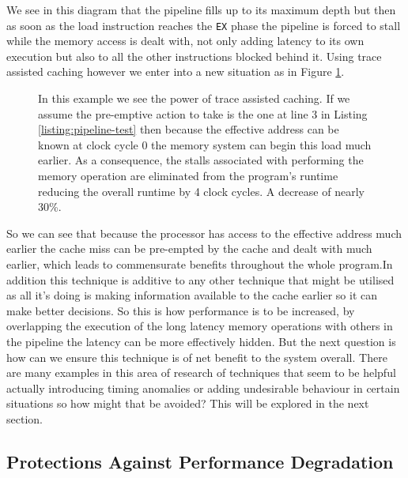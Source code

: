 We see in this diagram that the pipeline fills up to its maximum depth but then as soon as the load instruction reaches the \texttt{EX} phase the pipeline is forced to stall while the memory access is dealt with, not only adding latency to its own execution but also to all the other instructions blocked behind it. Using trace assisted caching however we enter into a new situation as in Figure \ref{fig:ideal-pipeline}.

\begin{figure}
	\begin{center}
		
		\caption[Pipeline Diagram - With Trace Assisted Caching]{In this example we see the power of trace assisted caching. If we assume the pre-emptive action to take is the one at line 3 in Listing \ref{listing:pipeline-test} then because the effective address can be known at clock cycle 0 the memory system can begin this load much earlier. As a consequence, the stalls associated with performing the memory operation are eliminated from the program's runtime reducing the overall runtime by 4 clock cycles. A decrease of nearly 30\%.}
		\label{fig:ideal-pipeline}
	\end{center}
\end{figure}


So we can see that because the processor has access to the effective address much earlier the cache miss can be pre-empted by the cache and dealt with much earlier, which leads to commensurate benefits throughout the whole program.In addition this technique is additive to any other technique that might be utilised as all it's doing is making information available to the cache earlier so it can make better decisions. So this is how performance is to be increased, by overlapping the execution of the long latency memory operations with others in the pipeline the latency can be more effectively hidden. But the next question is how can we ensure this technique is of net benefit to the system overall. There are many examples in this area of research of techniques that seem to be helpful actually introducing timing anomalies or adding undesirable behaviour in certain situations so how might that be avoided? This will be explored in the next section.

\subsection{Protections Against Performance Degradation}

